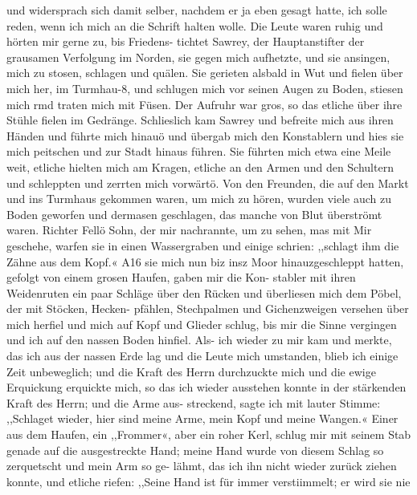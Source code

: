und widersprach sich damit selber, nachdem er ja eben gesagt
hatte, ich solle reden, wenn ich mich an die Schrift halten wolle.
Die Leute waren ruhig und hörten mir gerne zu, bis Friedens-
tichtet Sawrey, der Hauptanstifter der grausamen Verfolgung
im Norden, sie gegen mich aufhetzte, und sie ansingen, mich zu
stosen, schlagen und quälen. Sie gerieten alsbald in Wut und
fielen über mich her, im Turmhau-8, und schlugen mich vor seinen
Augen zu Boden, stiesen mich rmd traten mich mit Füsen. Der
Aufruhr war gros, so das etliche über ihre Stühle fielen im
Gedränge. Schlieslich kam Sawrey und befreite mich aus ihren
Händen und führte mich hinauö und übergab mich den Konstablern
und hies sie mich peitschen und zur Stadt hinaus führen. Sie
führten mich etwa eine Meile weit, etliche hielten mich am Kragen,
etliche an den Armen und den Schultern und schleppten und
zerrten mich vorwärtö. Von den Freunden, die auf den Markt
und ins Turmhaus gekommen waren, um mich zu hören, wurden
viele auch zu Boden geworfen und dermasen geschlagen, das
manche von Blut überströmt waren. Richter Fellö Sohn, der
mir nachrannte, um zu sehen, mas mit Mir geschehe, warfen sie
in einen Wassergraben und einige schrien: ,,schlagt ihm die Zähne
aus dem Kopf.« A16 sie mich nun biz insz Moor hinauzgeschleppt
hatten, gefolgt von einem grosen Haufen, gaben mir die Kon-
stabler mit ihren Weidenruten ein paar Schläge über den
Rücken und überliesen mich dem Pöbel, der mit Stöcken, Hecken-
pfählen, Stechpalmen und Gichenzweigen versehen über mich
herfiel und mich auf Kopf und Glieder schlug, bis mir die
Sinne vergingen und ich auf den nassen Boden hinfiel. Als-
ich wieder zu mir kam und merkte, das ich aus der nassen
Erde lag und die Leute mich umstanden, blieb ich einige
Zeit unbeweglich; und die Kraft des Herrn durchzuckte mich und
die ewige Erquickung erquickte mich, so das ich wieder ausstehen
konnte in der stärkenden Kraft des Herrn; und die Arme aus-
streckend, sagte ich mit lauter Stimme: ,,Schlaget wieder, hier
sind meine Arme, mein Kopf und meine Wangen.« Einer aus
dem Haufen, ein ,,Frommer«, aber ein roher Kerl, schlug mir
mit seinem Stab genade auf die ausgestreckte Hand; meine Hand
wurde von diesem Schlag so zerquetscht und mein Arm so ge-
lähmt, das ich ihn nicht wieder zurück ziehen konnte, und etliche
riefen: ,,Seine Hand ist für immer verstiimmelt; er wird sie nie


